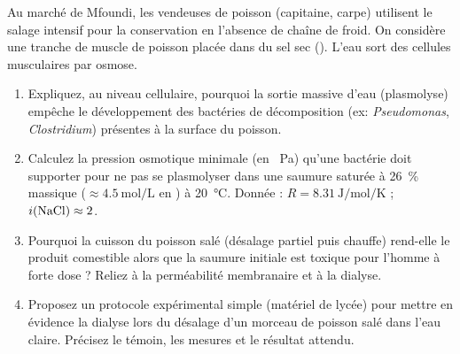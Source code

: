 \documentclass[11pt]{article}
\begin{document}
\begin{exercice}
Au marché de Mfoundi, les vendeuses de poisson (capitaine, carpe) utilisent le salage intensif pour la conservation en l'absence de chaîne de froid. On considère une tranche de muscle de poisson placée dans du sel sec (). L'eau sort des cellules musculaires par osmose.
\begin{enumerate}
    \item Expliquez, au niveau cellulaire, pourquoi la sortie massive d'eau (plasmolyse) empêche le développement des bactéries de décomposition (ex: \textit{Pseudomonas}, \textit{Clostridium}) présentes à la surface du poisson.
    \item Calculez la pression osmotique minimale (en \SI{}{\pascal}) qu'une bactérie doit supporter pour ne pas se plasmolyser dans une saumure saturée à \SI{26}{\%} massique ($ \approx \SI{4,5}{\mole\per\liter} $ en ) à \SI{20}{\celsius}. Donnée : $R = \SI{8,31}{\joule\per\mole\per\kelvin}$ ; $i(\ce{NaCl}) \approx 2$.
    \item Pourquoi la cuisson du poisson salé (désalage partiel puis chauffe) rend-elle le produit comestible alors que la saumure initiale est toxique pour l'homme à forte dose ? Reliez à la perméabilité membranaire et à la dialyse.
    \item Proposez un protocole expérimental simple (matériel de lycée) pour mettre en évidence la dialyse lors du désalage d'un morceau de poisson salé dans l'eau claire. Précisez le témoin, les mesures et le résultat attendu.
\end{enumerate}
\end{exercice}
\end{document}
